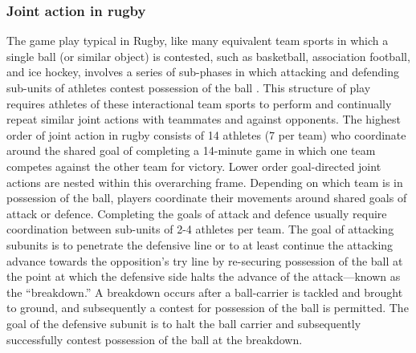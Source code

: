 \begin{CJK}{UTF8}{gbsn}
\subsubsection{Joint action in rugby \label{sect:jointActionRugby}}
The game play typical in Rugby, like many equivalent team sports in which a single ball (or similar object) is contested, such as basketball, association football, and ice hockey, involves a series of sub-phases in which attacking and defending sub-units of athletes contest possession of the ball \citep{Passos2011}. This structure of play requires athletes of these interactional team sports to perform and continually repeat similar joint actions with teammates and against opponents.   The highest order of joint action in rugby consists of 14 athletes (7 per team) who coordinate around the shared goal of completing a 14-minute game in which one team competes against the other team for victory. Lower order goal-directed joint actions are nested within this overarching frame.  Depending on which team is in possession of the ball, players coordinate their movements around shared goals of attack or defence.  Completing the goals of attack and defence usually require coordination between sub-units of 2-4 athletes per team.  The goal of attacking subunits is to penetrate the defensive line or to at least continue the attacking advance towards the opposition's try line by re-securing possession of the ball at the point at which the defensive side halts the advance of the attack---known as the ``breakdown.''  A breakdown occurs after a ball-carrier is tackled and brought to ground, and subsequently a contest for possession of the ball is permitted.  The goal of the defensive subunit is to halt the ball carrier and subsequently successfully contest possession of the ball at the breakdown.


\end{CJK}
